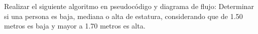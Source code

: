 
\question Realizar el siguiente algoritmo en pseudocódigo y diagrama de
          flujo: Determinar si una persona es baja, mediana o alta de estatura,
          considerando que de 1.50 metros es baja y mayor a 1.70 metros es
          alta.

